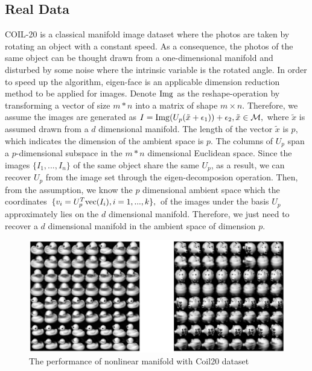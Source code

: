 \documentclass{article}
\theoremstyle{remark}
\begin{document}
\subsection{Real Data}
COIL-20 \cite{COIL-20} is a classical manifold image dataset where the photos are taken by rotating an object with a constant speed. As a consequence, the photos of the same object can be thought drawn from a one-dimensional manifold and disturbed by some noise where the intrinsic variable is the rotated angle. %
In order to speed up the algorithm, eigen-face is an applicable dimension reduction method to be applied for images. Denote ${\rm Img}$ as the reshape-operation by transforming a vector of size $m*n$ into a matrix of shape $m\times n$. Therefore, we assume the images are generated as
$
I = {\rm Img} (U_{p}(\tilde{x}+\epsilon_1))+\epsilon_2, \tilde{x}\in \cal M,
$
where $\tilde{x}$ is assumed drawn from a $d$ dimensional manifold. The length of the vector $\tilde{x}$ is $p$, which indicates the dimension of the ambient space is $p$. The columns of $U_p$ span a $p$-dimensional subspace in the $m*n$ dimensional Euclidean space. 
Since the images $\{I_1,...,I_n\}$ of the same object share the same $U_p$, as a result, we can recover $U_p$ from the image set through the eigen-decomposion operation.  Then, from the assumption, we know the $p$ dimensional ambient space which the coordinates 
$
\{v_i = U_p^T {\rm vec}(I_i), i = 1,...,k\},
$
of the images under the basis $U_p$ approximately lies on the $d$ dimensional manifold. Therefore, we just need to recover a $d$ dimensional manifold in the ambient space of dimension $p$.


\begin{figure}[h] %
   \centering
   \includegraphics[width=\linewidth]{real.eps} 
   \vspace{-0.4cm}
   \caption{The performance of nonlinear manifold with Coil20 dataset}
   \label{fig:example Coil20}
\end{figure}
\end{document}
